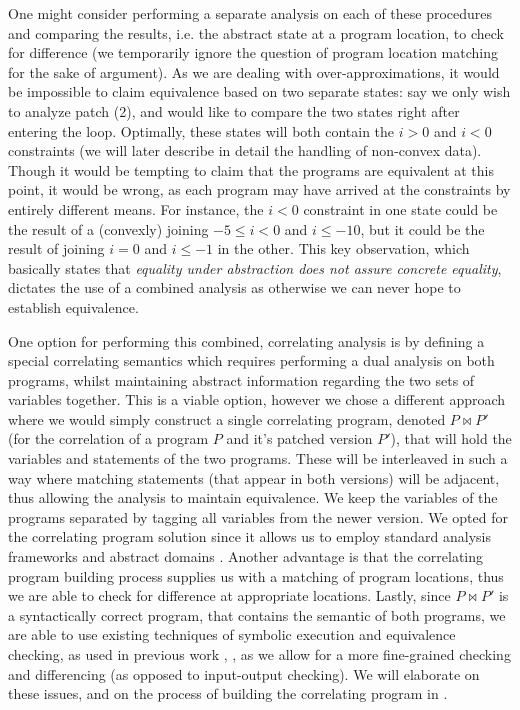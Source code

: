 One might consider performing a separate analysis on each of these procedures and comparing the results, i.e. the abstract state at a program location, to check for difference (we temporarily ignore the question of program location matching for the sake of argument). As we are dealing with over-approximations, it would be impossible to claim equivalence based on two separate states: say we only wish to analyze patch (2), and would like to compare the two states right after entering the loop. Optimally, these states will both contain the ${i > 0}$ and ${i < 0}$ constraints (we will later describe in detail the handling of non-convex data). Though it would be tempting to claim that the programs are equivalent at this point, it would be wrong, as each program may have arrived at the constraints by entirely different means. For instance, the ${i < 0}$ constraint in one state could be the result of a (convexly) joining ${-5 \leq i < 0}$ and ${i \leq -10}$, but it could be the result of joining ${i = 0}$ and ${i \leq -1}$ in the other. This key observation, which basically states that \emph{equality under abstraction does not assure concrete equality}, dictates the use of a combined analysis as otherwise we can never hope to establish equivalence.



One option for performing this combined, correlating analysis is by defining a special correlating semantics which requires performing a dual analysis on both programs, whilst maintaining abstract information regarding the two sets of variables together. This is a viable option, however we chose a different approach where we would simply construct a single correlating program, denoted $P \bowtie P'$ (for the correlation of a program $P$ and it's patched version $P'$), that will hold the variables and statements of the two programs. These will be interleaved in such a way where matching statements (that appear in both versions) will be adjacent, thus allowing the analysis to maintain equivalence. We keep the variables of the programs separated by tagging all variables from the newer version. We opted for the correlating program solution since it allows us to employ standard analysis frameworks \cite{CLang} and abstract domains \cite{JeannetMine09}. Another advantage is that the correlating program building process supplies us with a matching of program locations, thus we are able to check for difference at appropriate locations. Lastly, since $P \bowtie P'$ is a syntactically correct program, that contains the semantic of both programs, we are able to use existing techniques of symbolic execution and equivalence checking, as used in previous work \cite{GodlinStrichman09,DwyerElbaumPerson08,EnglerRamos11}, , as we allow for a more fine-grained checking and differencing (as opposed to input-output checking). We will elaborate on these issues, and on the process of building the correlating program in .

